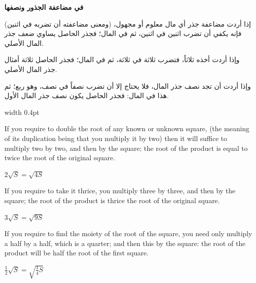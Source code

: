 \documentclass[11pt,a4paper]{book}
\begin{document}
\noindent\begin{minipage}[t]{0.48\textwidth}
\raggedleft

\begin{Arabic}
\textbf{في مضاعفة الجذور ونصفها}

إذا أردت مضاعفة جذر أي مال معلوم أو مجهول، (ومعنى مضاعفته أن تضربه في اثنين) فإنه يكفي أن تضرب اثنين في اثنين، ثم في المال؛ فجذر الحاصل يساوي ضعف جذر المال الأصلي.

وإذا أردت أخذه ثلاثاً، فتضرب ثلاثة في ثلاثة، ثم في المال؛ فجذر الحاصل ثلاثة أمثال جذر المال الأصلي.

وإذا أردت أن تجد نصف جذر المال، فلا يحتاج إلا أن تضرب نصفاً في نصف، وهو ربع؛ ثم هذا في المال: فجذر الحاصل يكون نصف جذر المال الأول.
\end{Arabic}

\end{minipage}%
\hfill\vrule width 0.4pt\hfill
\begin{minipage}[t]{0.48\textwidth}
\raggedright

If you require to double the root of any known or unknown square, (the meaning of its duplication being that you multiply it by two) then it will suffice to multiply two by two, and then by the square; the root of the product is equal to twice the root of the original square.

$2\sqrt{S} = \sqrt{4S}$

\vspace{0.2cm}

If you require to take it thrice, you multiply three by three, and then by the square; the root of the product is thrice the root of the original square.

$3\sqrt{S} = \sqrt{9S}$

\vspace{0.2cm}

If you require to find the moiety of the root of the square, you need only multiply a half by a half, which is a quarter; and then this by the square: the root of the product will be half the root of the first square.

$\tfrac{1}{2}\sqrt{S} = \sqrt{\tfrac{1}{4}S}$

\end{minipage}
\vspace{0.3cm}

\newpage

\end{document}
